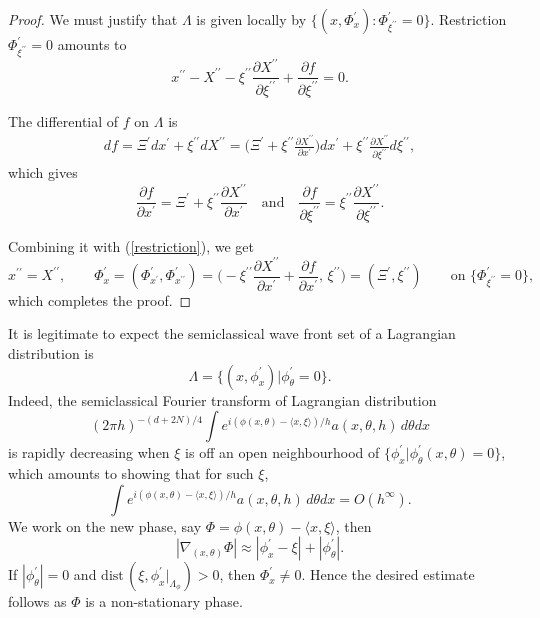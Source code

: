 \documentclass[10pt, a4paper, twoside]{amsart}
\numberwithin{equation}{section}
\theoremstyle{remark}
\begin{document}
\begin{appendix}
	\begin{proof}
	We must justify that $\Lambda$ is given locally by $\{(x, \Phi^\prime_x) : \Phi^\prime_{\xi^{\prime\prime}} = 0\}$. Restriction $\Phi^\prime_{\xi^{\prime\prime}} = 0$ amounts to \begin{equation}\label{restriction} x^{\prime\prime} - X^{\prime\prime} -  \xi^{\prime\prime} \frac{\partial X^{\prime\prime}}{\partial \xi^{\prime\prime}}  + \frac{\partial f}{\partial \xi^{\prime\prime}} = 0.\end{equation}
	
	The differential of $f$ on $\Lambda$ is \begin{eqnarray*}
	df = \Xi^\prime dx^\prime + \xi^{\prime\prime} dX^{\prime\prime} = \bigg(\Xi^\prime + \xi^{\prime\prime}  \frac{\partial X^{\prime\prime}}{\partial x^\prime}\bigg) dx^\prime + \xi^{\prime\prime} \frac{\partial X^{\prime\prime}}{\partial \xi^{\prime\prime}} d\xi^{\prime\prime},\end{eqnarray*} which gives 
	\begin{equation}\label{restriction2}\frac{\partial f}{\partial x^\prime} = \Xi^\prime + \xi^{\prime\prime}  \frac{\partial X^{\prime\prime}}{\partial x^\prime} \quad \text{and} \quad \frac{\partial f}{\partial \xi^{\prime\prime}} = \xi^{\prime\prime} \frac{\partial X^{\prime\prime}}{\partial \xi^{\prime\prime}}.
	\end{equation}
	
	Combining it with (\ref{restriction}), we get $$x^{\prime\prime} = X^{\prime\prime},\quad \quad \Phi_x^\prime = (\Phi_{x^{\prime}}^\prime, \Phi_{x^{\prime\prime}}^\prime) = \bigg(- \xi^{\prime\prime} \frac{\partial X^{\prime\prime}}{\partial x^\prime} + \frac{\partial f}{\partial x^\prime},\, \xi^{\prime\prime}\bigg) = (\Xi^\prime, \xi^{\prime\prime}) \quad\quad \text{on $\{\Phi^\prime_{\xi^{\prime\prime}} = 0\}$},$$ which completes the proof.
	\end{proof}
	
	
	\vskip 5pt 
	
	It is legitimate to expect the  semiclassical wave front set of a Lagrangian distribution is $$ \Lambda = \{(x, \phi^\prime_x ) | \phi_\theta^\prime = 0\}.$$ Indeed, the semiclassical Fourier transform of Lagrangian distribution $$(2 \pi h)^{-(d + 2N)/4} \int e^{i(\phi(x, \theta) - \langle x, \xi \rangle) / h} a(x, \theta, h) \, d\theta dx$$ is rapidly decreasing when $\xi$ is off an open neighbourhood of $\{\phi^\prime_x | \phi^\prime_\theta (x, \theta) = 0\}$, which amounts to showing that for such $\xi$, $$\int e^{i(\phi(x, \theta) - \langle x, \xi \rangle)/h} a(x, \theta, h) \, d\theta dx = O(h^\infty).$$ We work on the new phase, say $\Phi = \phi(x, \theta) - \langle x, \xi \rangle$, then $$|\nabla_{(x, \theta)} \Phi| \approx |\phi_x^\prime - \xi| + |\phi^\prime_\theta|.$$ If $|\phi_\theta^\prime| = 0$ and $\text{dist} \, (\xi, \phi^\prime_x|_{\Lambda_\phi}) > 0$, then $\Phi^\prime_x \neq 0$. Hence the desired estimate follows as $\Phi$ is a non-stationary phase. 
	

\end{appendix}
\end{document}
